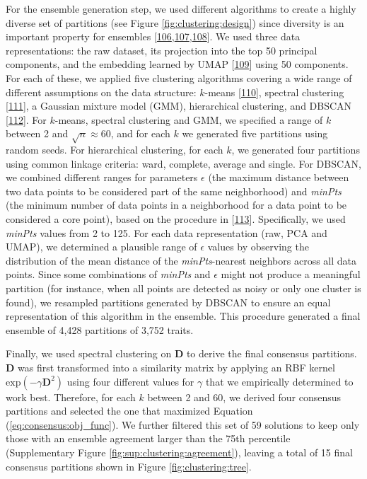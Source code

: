\documentclass[
        11pt,
]{article}
\begin{document}
For the ensemble generation step, we used different algorithms to create a highly diverse set of partitions (see Figure \ref{fig:clustering:design}) since diversity is an important property for ensembles {[}\protect\hyperlink{ref-8js8Q3pF}{106},\protect\hyperlink{ref-rcTMvL18}{107},\protect\hyperlink{ref-t5p3UpxZ}{108}{]}.
We used three data representations: the raw dataset, its projection into the top 50 principal components, and the embedding learned by UMAP {[}\protect\hyperlink{ref-157h5hA34}{109}{]} using 50 components.
For each of these, we applied five clustering algorithms covering a wide range of different assumptions on the data structure: \(k\)-means {[}\protect\hyperlink{ref-MxGpAiPu}{110}{]}, spectral clustering {[}\protect\hyperlink{ref-x3CT24TB}{111}{]}, a Gaussian mixture model (GMM), hierarchical clustering, and DBSCAN {[}\protect\hyperlink{ref-JrL3iQea}{112}{]}.
For \(k\)-means, spectral clustering and GMM, we specified a range of \(k\) between 2 and \(\sqrt{n} \approx 60\), and for each \(k\) we generated five partitions using random seeds.
For hierarchical clustering, for each \(k\), we generated four partitions using common linkage criteria: ward, complete, average and single.
For DBSCAN, we combined different ranges for parameters \(\epsilon\) (the maximum distance between two data points to be considered part of the same neighborhood) and \emph{minPts} (the minimum number of data points in a neighborhood for a data point to be considered a core point), based on the procedure in {[}\protect\hyperlink{ref-FB7XPWl6}{113}{]}.
Specifically, we used \emph{minPts} values from 2 to 125.
For each data representation (raw, PCA and UMAP), we determined a plausible range of \(\epsilon\) values by observing the distribution of the mean distance of the \emph{minPts}-nearest neighbors across all data points.
Since some combinations of \emph{minPts} and \(\epsilon\) might not produce a meaningful partition (for instance, when all points are detected as noisy or only one cluster is found), we resampled partitions generated by DBSCAN to ensure an equal representation of this algorithm in the ensemble.
This procedure generated a final ensemble of 4,428 partitions of 3,752 traits.

Finally, we used spectral clustering on \(\mathbf{D}\) to derive the final consensus partitions.
\(\mathbf{D}\) was first transformed into a similarity matrix by applying an RBF kernel \(\mathrm{exp}(-\gamma \mathbf{D}^2)\) using four different values for \(\gamma\) that we empirically determined to work best.
Therefore, for each \(k\) between 2 and 60, we derived four consensus partitions and selected the one that maximized Equation (\ref{eq:consensus:obj_func}).
We further filtered this set of 59 solutions to keep only those with an ensemble agreement larger than the 75th percentile (Supplementary Figure \ref{fig:sup:clustering:agreement}), leaving a total of 15 final consensus partitions shown in Figure \ref{fig:clustering:tree}.
\end{document}
